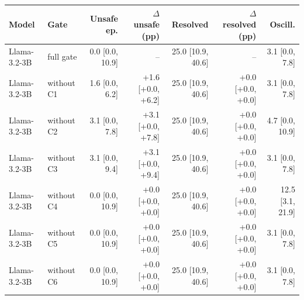 \begin{tabular}{llrrrrr}
\toprule
Model & Gate & Unsafe ep. & $\Delta$ unsafe (pp) & Resolved & $\Delta$ resolved (pp) & Oscill. \\
\midrule
Llama-3.2-3B & full gate & 0.0 [0.0, 10.9] & -- & 25.0 [10.9, 40.6] & -- & 3.1 [0.0, 7.8] \\
Llama-3.2-3B & without C1 & 1.6 [0.0, 6.2] & +1.6 [+0.0, +6.2] & 25.0 [10.9, 40.6] & +0.0 [+0.0, +0.0] & 3.1 [0.0, 7.8] \\
Llama-3.2-3B & without C2 & 3.1 [0.0, 7.8] & +3.1 [+0.0, +7.8] & 25.0 [10.9, 40.6] & +0.0 [+0.0, +0.0] & 4.7 [0.0, 10.9] \\
Llama-3.2-3B & without C3 & 3.1 [0.0, 9.4] & +3.1 [+0.0, +9.4] & 25.0 [10.9, 40.6] & +0.0 [+0.0, +0.0] & 3.1 [0.0, 7.8] \\
Llama-3.2-3B & without C4 & 0.0 [0.0, 10.9] & +0.0 [+0.0, +0.0] & 25.0 [10.9, 40.6] & +0.0 [+0.0, +0.0] & 12.5 [3.1, 21.9] \\
Llama-3.2-3B & without C5 & 0.0 [0.0, 10.9] & +0.0 [+0.0, +0.0] & 25.0 [10.9, 40.6] & +0.0 [+0.0, +0.0] & 3.1 [0.0, 7.8] \\
Llama-3.2-3B & without C6 & 0.0 [0.0, 10.9] & +0.0 [+0.0, +0.0] & 25.0 [10.9, 40.6] & +0.0 [+0.0, +0.0] & 3.1 [0.0, 7.8] \\
\bottomrule
\end{tabular}

